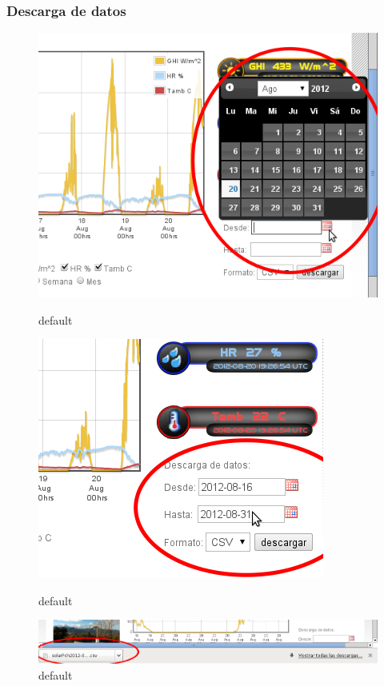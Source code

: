 \subsubsection{Descarga de datos}
\begin{figure}[ht]
	\begin{minipage}[b]{0.45\linewidth}
        	\centering
        	\includegraphics[width=\textwidth]{./images/cap5chap1img2-1}
        	\caption{default}
        	\label{fig:figure1}
	\end{minipage}
	\begin{minipage}[b]{0.45\linewidth}
	 	\centering
        	\includegraphics[width=\textwidth]{./images/cap5chap1img2-2}
        	\caption{default}
        	\label{fig:figure1}
	\end{minipage}
	\begin{minipage}[b]{0.45\linewidth}
		\centering
        	\includegraphics[width=\textwidth]{./images/cap5chap1img2-3}
        	\caption{default}
        	\label{fig:figure1}
	\end{minipage}
\end{figure}
